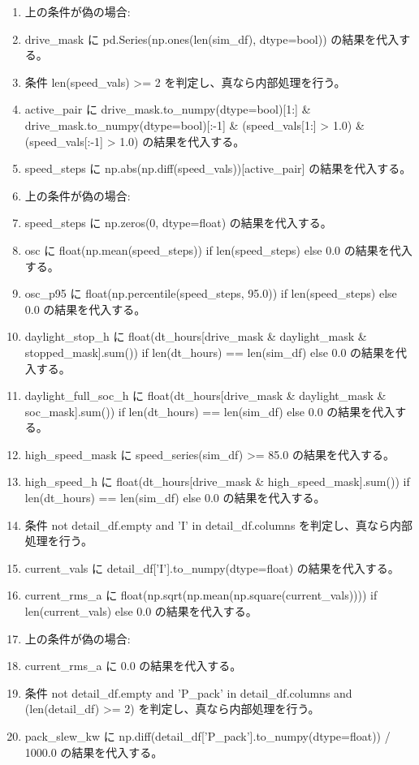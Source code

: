 \documentclass[a4paper,11pt]{article}
\begin{document}
\begin{enumerate}[leftmargin=1.8em]
\item   上の条件が偽の場合:
\item   drive\_mask に pd.Series(np.ones(len(sim\_df), dtype=bool)) の結果を代入する。
\item 条件 len(speed\_vals) >= 2 を判定し、真なら内部処理を行う。
\item   active\_pair に drive\_mask.to\_numpy(dtype=bool)[1:] \& drive\_mask.to\_numpy(dtype=bool)[:-1] \& (speed\_vals[1:] > 1.0) \& (speed\_vals[:-1] > 1.0) の結果を代入する。
\item   speed\_steps に np.abs(np.diff(speed\_vals))[active\_pair] の結果を代入する。
\item   上の条件が偽の場合:
\item   speed\_steps に np.zeros(0, dtype=float) の結果を代入する。
\item osc に float(np.mean(speed\_steps)) if len(speed\_steps) else 0.0 の結果を代入する。
\item osc\_p95 に float(np.percentile(speed\_steps, 95.0)) if len(speed\_steps) else 0.0 の結果を代入する。
\item daylight\_stop\_h に float(dt\_hours[drive\_mask \& daylight\_mask \& stopped\_mask].sum()) if len(dt\_hours) == len(sim\_df) else 0.0 の結果を代入する。
\item daylight\_full\_soc\_h に float(dt\_hours[drive\_mask \& daylight\_mask \& soc\_mask].sum()) if len(dt\_hours) == len(sim\_df) else 0.0 の結果を代入する。
\item high\_speed\_mask に speed\_series(sim\_df) >= 85.0 の結果を代入する。
\item high\_speed\_h に float(dt\_hours[drive\_mask \& high\_speed\_mask].sum()) if len(dt\_hours) == len(sim\_df) else 0.0 の結果を代入する。
\item 条件 not detail\_df.empty and 'I' in detail\_df.columns を判定し、真なら内部処理を行う。
\item   current\_vals に detail\_df['I'].to\_numpy(dtype=float) の結果を代入する。
\item   current\_rms\_a に float(np.sqrt(np.mean(np.square(current\_vals)))) if len(current\_vals) else 0.0 の結果を代入する。
\item   上の条件が偽の場合:
\item   current\_rms\_a に 0.0 の結果を代入する。
\item 条件 not detail\_df.empty and 'P\_pack' in detail\_df.columns and (len(detail\_df) >= 2) を判定し、真なら内部処理を行う。
\item   pack\_slew\_kw に np.diff(detail\_df['P\_pack'].to\_numpy(dtype=float)) / 1000.0 の結果を代入する。

\end{enumerate}
\end{document}

